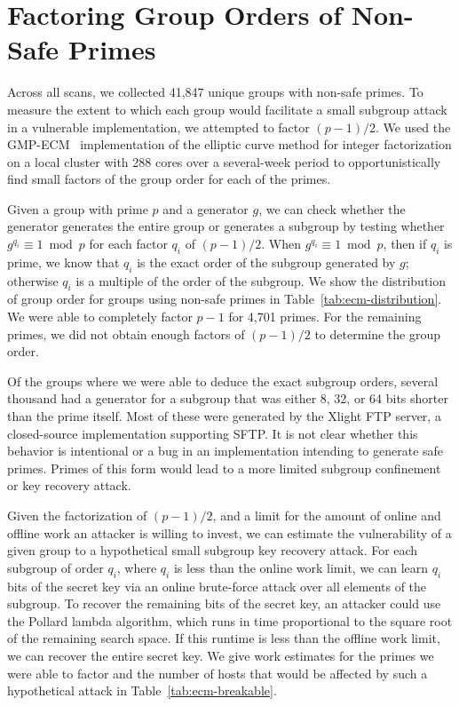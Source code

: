 
\section{Factoring Group Orders of Non-Safe Primes}
\label{sec:ecm}

Across all scans, we collected 41,847 unique groups with non-safe primes.
To measure the extent to which each group would facilitate a small subgroup
attack in a vulnerable implementation, we attempted to factor $(p-1)/2$. We
used the GMP-ECM~\cite{gmp-ecm} implementation of the elliptic curve method for
integer factorization on a local cluster with 288 cores over a several-week
period to opportunistically find small factors of the group order for each of
the primes.


Given a group with prime $p$ and a generator $g$, we can check whether the
generator generates the entire group or generates a subgroup by testing whether
$g^{q_i} \equiv 1 \bmod p$ for each factor $q_i$ of $(p-1)/2$.  When $g^{q_i}
\equiv 1 \bmod p$, then if $q_i$ is prime, we know that $q_i$ is the exact
order of the subgroup generated by $g$; otherwise $q_i$ is a multiple of the
order of the subgroup. We show the distribution of group order for groups using
non-safe primes in Table~\ref{tab:ecm-distribution}.  We were able to
completely factor $p-1$ for 4,701 primes.  For the remaining primes, we
did not obtain enough factors of $(p-1)/2$ to determine the group order. 


Of the groups where we were able to deduce the exact subgroup orders, several
thousand had a generator for a subgroup that was either 8, 32, or 64 bits
shorter than the prime itself.  Most of these were generated by the Xlight FTP
server, a closed-source implementation supporting SFTP.  It is not clear
whether this behavior is intentional or a bug in an implementation intending to
generate safe primes.  Primes of this form would lead to a more limited
subgroup confinement or key recovery attack.

Given the factorization of $(p-1)/2$, and a limit for the amount of online and
offline work an attacker is willing to invest, we can estimate the
vulnerability of a given group to a hypothetical small subgroup key recovery
attack. For each subgroup of order $q_i$, where $q_i$ is less than the online
work limit, we can learn $q_i$ bits of the secret key via an online brute-force
attack over all elements of the subgroup. To recover the remaining bits of the
secret key, an attacker could use the Pollard lambda algorithm, which runs in
time proportional to the square root of the remaining search space. If this
runtime is less than the offline work limit, we can recover the entire secret
key. We give work estimates for the primes we were able to factor and the
number of hosts that would be affected by such a hypothetical attack in
Table~\ref{tab:ecm-breakable}.

